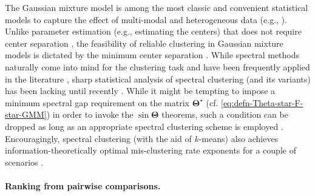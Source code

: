The Gaussian mixture model is among the most classic and convenient statistical models to capture the effect of multi-modal and heterogeneous data
(e.g., \citet{pearson1894contributions,titterington1985statistical,xu1996convergence,dasgupta1999learning,hsu2013learning,kalai2010efficiently,balakrishnan2014statistical,xu2016global,jin2016local,fei2018hidden,jin2017phase,dan2020sharp,han2020eigen}).
Unlike parameter estimation (e.g., estimating the centers) that does not require center separation \citep{wu2020optimal},
the feasibility of reliable clustering in Gaussian mixture models
is dictated by the minimum center separation \citep{lu2016statistical,cai2018rate,ndaoud2018sharp,giraud2019partial,chen2020cutoff}.
While spectral methods naturally come into mind for the clustering task and have been frequently applied in the literature \citep{von2007tutorial,vempala2004spectral,kannan2008spectral,kumar2010kmeans,awasthi2012improved},
sharp statistical analysis of spectral clustering (and its variants)
has been lacking until recently \citep{ndaoud2018sharp,loffler2019optimality,srivastava2019robust,abbe2020ell_p}.
While it might be tempting to impose a minimum spectral gap requirement on the matrix $\bm{\Theta}^{\star}$ (cf. \eqref{eq:defn-Theta-star-F-star-GMM}) in order to invoke the $\sin\bm{\Theta}$ theorems,
such a condition can be dropped as long as an appropriate spectral clustering scheme is employed \citep{loffler2019optimality}.
Encouragingly, spectral clustering (with the aid of $k$-means) also achieves information-theoretically optimal mis-clustering rate exponents for a couple of scenarios  \citep{loffler2019optimality,abbe2020ell_p}.










 \paragraph{Ranking from pairwise comparisons.}


